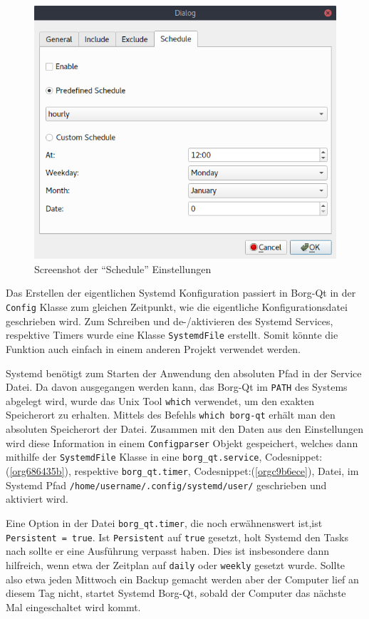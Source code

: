 \begin{figure}[H]
\centering
\includegraphics[width=.9\linewidth]{pictures/borgqt_settings_schedule.png}
\caption{\label{fig:orga59a60c}
Screenshot der "`Schedule"' Einstellungen}
\end{figure}

Das Erstellen der eigentlichen Systemd Konfiguration passiert in Borg-Qt in der
\texttt{Config} Klasse zum gleichen Zeitpunkt, wie die eigentliche Konfigurationsdatei
geschrieben wird. Zum Schreiben und de-/aktivieren des Systemd Services,
respektive Timers wurde eine Klasse \texttt{SystemdFile} erstellt. Somit könnte
die Funktion auch einfach in einem anderen Projekt verwendet werden.

Systemd benötigt zum Starten der Anwendung den absoluten Pfad in der Service
Datei. Da davon ausgegangen werden kann, das Borg-Qt im \texttt{PATH} des Systems
abgelegt wird, wurde das Unix Tool \texttt{which} verwendet, um den exakten Speicherort
zu erhalten. Mittels des Befehls \texttt{which borg-qt} erhält man den absoluten
Speicherort der Datei. Zusammen mit den Daten aus den Einstellungen wird diese
Information in einem \texttt{Configparser} Objekt gespeichert, welches dann mithilfe
der \texttt{SystemdFile} Klasse in eine \texttt{borg\_qt.service},
Codesnippet:(\ref{org686435b}), respektive \texttt{borg\_qt.timer},\newline
Codesnippet:(\ref{orgc9b6ece}), Datei, im Systemd Pfad
\texttt{/home/username/.config/systemd/user/} geschrieben und aktiviert wird.

Eine Option in der Datei \texttt{borg\_qt.timer}, die noch erwähnenswert ist,\newline ist
\texttt{Persistent = true}. Ist \texttt{Persistent} auf \texttt{true} gesetzt, holt Systemd den
Tasks nach sollte er eine Ausführung verpasst haben. Dies ist insbesondere dann
hilfreich, wenn etwa der Zeitplan auf \texttt{daily} oder \texttt{weekly} gesetzt wurde.
Sollte also etwa jeden Mittwoch ein Backup gemacht werden aber der Computer
lief an diesem Tag nicht, startet Systemd Borg-Qt, sobald der Computer das
nächste Mal eingeschaltet wird kommt.

